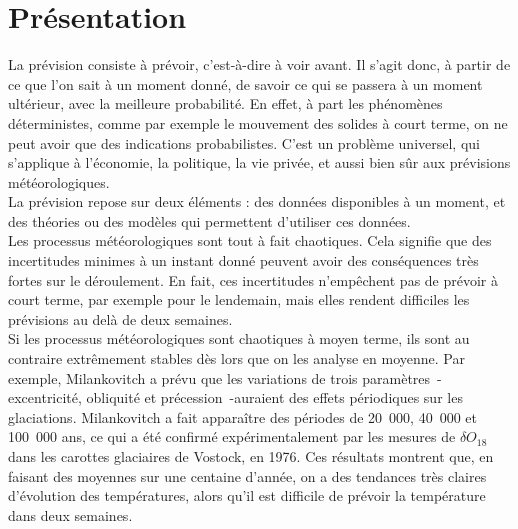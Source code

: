 \documentclass[11pt,a4paper]{article}
\begin{document}
\section{Présentation} 
La prévision consiste à prévoir, c'est-à-dire à \og voir avant\fg{}. Il s'agit donc, à partir de ce que l'on sait à un moment donné, de savoir ce qui se passera à un moment ultérieur, avec la meilleure probabilité. En effet, à part les phénomènes déterministes, comme par exemple le mouvement des solides à court terme, on ne peut avoir que des indications probabilistes. C'est un problème universel, qui s'applique à l'économie, la politique, la vie privée, et aussi bien sûr aux prévisions météorologiques.\\   
La prévision repose sur deux éléments : des données disponibles à un moment, et des théories ou des modèles qui permettent d'utiliser ces données. \\
Les processus météorologiques sont tout à fait chaotiques. Cela signifie que des incertitudes minimes à un instant donné peuvent avoir des conséquences très fortes sur le déroulement. En fait, ces incertitudes n'empêchent pas de prévoir à court terme, par exemple pour le lendemain, mais elles rendent difficiles les prévisions au delà de deux semaines. \\
Si les processus météorologiques sont chaotiques à moyen terme, ils sont au contraire extrêmement stables dès lors que on les analyse en moyenne. Par exemple, Milankovitch a prévu que les variations de trois paramètres~-excentricité, obliquité et précession~-auraient des effets périodiques sur les glaciations. Milankovitch a fait apparaître des périodes de 20~000, 40~000 et 100~000 ans, ce qui a été confirmé expérimentalement par les mesures de $\delta O_{18}$ dans les carottes glaciaires de Vostock, en 1976. Ces résultats montrent que, en faisant des moyennes sur une centaine d'année, on a des tendances très claires d'évolution des températures, alors qu'il est difficile de prévoir la température dans deux semaines.   
\end{document}
